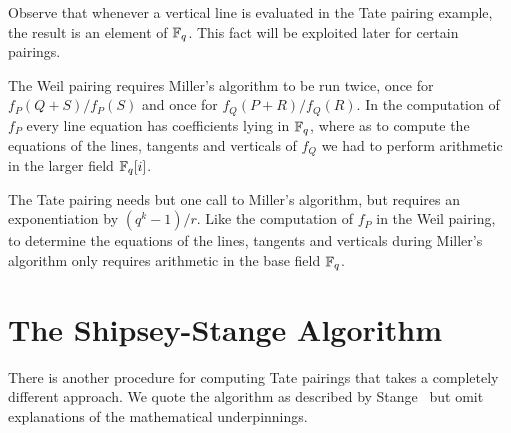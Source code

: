 Observe that whenever a vertical line is evaluated in the Tate pairing
example, the result is an element of $\mathbb{F}_q$. This fact will be exploited
later for certain pairings.

The Weil pairing requires Miller's algorithm to be run twice, once for
$f_P(Q+S) / f_P(S)$ and once for $f_Q(P+R)/f_Q(R)$. In the computation
of $f_P$ every line equation has coefficients lying in $\mathbb{F}_q$, where
as to compute the equations of the lines, tangents and verticals of $f_Q$
we had to perform arithmetic in the larger field $\mathbb{F}_q[i]$.

The Tate pairing needs but one call to Miller's algorithm,
but requires an exponentiation by $(q^k - 1)/r$. Like the computation
of $f_P$ in the Weil pairing, to determine the equations of the lines,
tangents and verticals during Miller's algorithm only requires arithmetic
in the base field $\mathbb{F}_q$.

\section {The Shipsey-Stange Algorithm}
There is another procedure for computing Tate pairings that takes a completely
different approach. We quote the algorithm as described by Stange~\cite{stange}
but omit explanations of the mathematical underpinnings.

